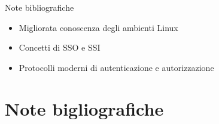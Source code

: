 \documentclass{beamer}
\begin{document}
	\begin{frame}{Note bibliografiche}
		
		\begin{itemize}
			\item Migliorata conoscenza degli ambienti Linux \vspace{.5em}
			\item Concetti di SSO e SSI \vspace{.5em}
			\item Protocolli moderni di autenticazione e autorizzazione \vspace{.5em}
		\end{itemize}
	
	\end{frame}
	\section{Note bigliografiche}





\end{document}
